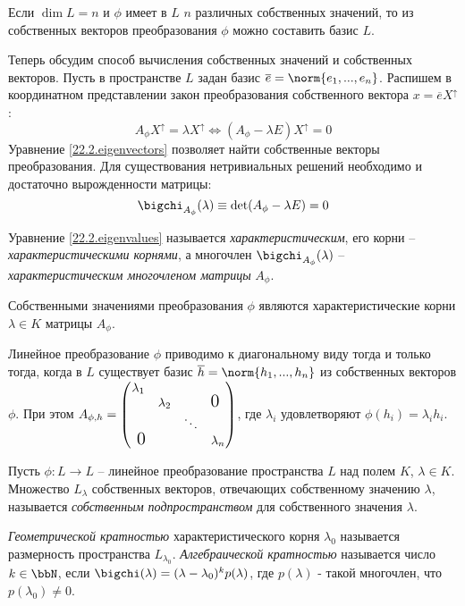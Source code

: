   \begin{cons}
  Если $\dim L = n$ и $\phi$ имеет в $L$ $n$ различных собственных значений, то из собственных векторов преобразования $\phi$ можно составить базис $L$.
  \end{cons}  
  
  Теперь обсудим способ вычисления собственных значений и собственных векторов. Пусть в пространстве $L$ задан базис $\overline e=\norm{e_1,...,e_n}$. Распишем в координатном представлении закон преобразования собственного вектора $x=\overline{e}X^\uparrow$:
  \begin{equation}\label{22.2.eigenvectors}
    A_\phi X^\uparrow=\lambda X^\uparrow \Leftrightarrow (A_\phi-\lambda E)X^\uparrow=0
  \end{equation}
Уравнение \ref{22.2.eigenvectors} позволяет найти собственные векторы преобразования. Для существования нетривиальных решений необходимо и достаточно вырожденности матрицы:
  \begin{equation}\label{22.2.eigenvalues}
  \bigchi_{A_\phi}(\lambda)\equiv\det(A_\phi-\lambda E)=0
  \end{equation}
  \begin{defn}
    Уравнение \ref{22.2.eigenvalues} называется \textit{характеристическим}, его корни -- \textit{характеристическими корнями}, а многочлен $\bigchi_{A_\phi}(\lambda)$ -- \textit{характеристическим многочленом матрицы} $A_\phi$.
  \end{defn}
  \begin{stt}
  Собственными значениями преобразования $\phi$ являются характеристические корни $\lambda \in K$ матрицы $A_\phi$.
  \end{stt}
  \begin{stt}
  Линейное преобразование $\phi$ приводимо к диагональному виду тогда и только тогда, когда в $L$ существует базис $\overline h = \norm{h_1,...,h_n}$ из собственных векторов $\phi$. При этом $A_{\phi,h}=
  \begin{pmatrix}
  \lambda_1 &           &        & \\
            & \lambda_2 &        & \fudge {0 }  \\
            &			& \ddots & \\
  \fudge{ 0}&			&		 & \lambda_n \\
  \end{pmatrix}$, где $\lambda_i$ удовлетворяют $\phi(h_i)=\lambda_i h_i$.
  \end{stt}
  \begin{defn}
  Пусть $\phi:L\rightarrow L$ -- линейное преобразование пространства $L$ над полем $K$, $\lambda \in K$. Множество $L_\lambda$ собственных векторов, отвечающих собственному значению $\lambda$, называется \textit{собственным подпространством} для собственного значения $\lambda$.
  \end{defn}
  \begin{defn}
  \textit{Геометрической кратностью} характеристического корня $\lambda_0$ называется размерность пространства $L_{\lambda_0}$.
  \textit{Алгебраической кратностью} называется число $k \in \bbN$, если $\bigchi(\lambda)=(\lambda-\lambda_0)^k p(\lambda)$, где $p(\lambda)$ - такой многочлен, что $p(\lambda_0) \neq 0$.
  \end{defn}

